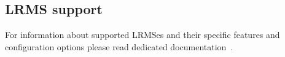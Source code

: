 \documentclass{article}                            %
\begin{document}
\subsection{LRMS support\label{sub:LRMS}}

For information about supported LRMSes and their specific features
and configuration options please read dedicated documentation~\cite{backends-arc1}.

\end{document}
